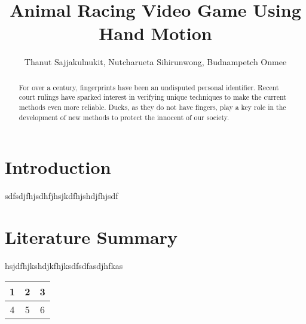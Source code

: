 \documentclass[11pt, oneside]{article}										%
\title{Animal Racing Video Game Using Hand Motion}
\author{Thanut Sajjakulnukit, Nutcharueta Sihirunwong, Budnampetch Onmee}
\begin{document}
        \maketitle														    %
        \begin{multicols*}{2}
        \twocolumn
        \begin{abstract}
            For over a century, fingerprints have been an undisputed        %
            personal identifier.  Recent court rulings have sparked
            interest in verifying unique techniques to make the current
            methods even more reliable. Ducks, as they do not have
            fingers, play a key role in the development of new methods to
            protect the innocent of our society.
        \end{abstract}

        \section{Introduction}                                              %
            sdfsdjfhjsdhfjhsjkdfhjshdjfhjsdf
            
        \section{Literature Summary}                                        %
            hsjdfhjkshdjkfhjksdfsdfasdjhfkas \\

            \begin{tabular} { | c | c | c | }
                \hline
                1 & 2 & 3 \\
                \hline
                4 & 5 & 6 \\
                \hline
            \end{tabular}
            
        \end{multicols*}
    \blinddocument
\end{document}
